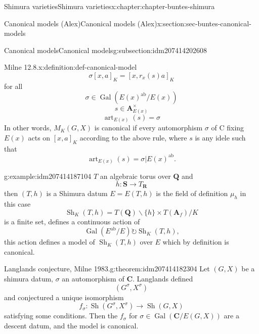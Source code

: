 \documentclass[oneside,10pt,]{book}
\numberwithin{equation}{section}
\newcommand{\lb}{[}
\newcommand{\rb}{]}
\newcommand{\QQ}{\mathbf{Q}}
\newcommand{\RR}{\mathbf{R}}
\newcommand{\CC}{\mathbf{C}}
\newcommand{\adeles}{\mathbf{A}}
\newcommand{\acts}{\circlearrowright}
\newcommand{\ab}{\mathrm{ab}}
\newcommand{\Gal}[2]{\operatorname{Gal}(#1/#2)}
\begin{document}
\begin{chapterptx}{Shimura varieties}{}{Shimura varieties}{}{}{x:chapter:chapter-buntes-shimura}
\begin{sectionptx}{Canonical models (Alex)}{}{Canonical models (Alex)}{}{}{x:section:sec-buntes-canonical-models}
\begin{subsectionptx}{Canonical models}{}{Canonical models}{}{}{g:subsection:idm207414202608}
\begin{definition}{Milne 12.8.}{x:definition:def-canonical-model}
\begin{equation*}
\sigma [x,a]_K = [x, r_x(s) a]_K
\end{equation*}
for all%
\begin{equation*}
\sigma \in \Gal{E(x)^\ab}{E(x)}
\end{equation*}
%
\begin{equation*}
s\in \adeles^\times_{E(x)}
\end{equation*}
%
\begin{equation*}
{\operatorname{art}}_{E(x)}(s) = \sigma
\end{equation*}
In other words, \(M_K(G,X)\) is canonical if every automorphism \(\sigma\) of C fixing \(E(x)\) acts on \(\lb x,a\rb_K\) according to the above rule, where \(s\) is any idele such that%
\begin{equation*}
{\operatorname{art}}_{E(x)}(s) = \sigma| E(x)^{\ab}\text{.}
\end{equation*}
%
\end{definition}
\begin{example}{}{g:example:idm207414187104}%
\(T \) an algebraic torus over \(\QQ\) and%
\begin{equation*}
h \colon \mathbf S \to T_\RR
\end{equation*}
then  \((T,h)\) is a Shimura datum \(E = E(T,h)\) is the field of definition \(\mu_h\) in this case%
\begin{equation*}
{\operatorname{Sh}}_K(T,h) = T(\QQ) \backslash \{h\}  \times T(\adeles_f) / K
\end{equation*}
is a finite set, defines a continuous action of%
\begin{equation*}
\Gal{E^\ab}{E} \acts {\operatorname{Sh}}_K(T,h)\text{,}
\end{equation*}
this action defines a model of \({\operatorname{Sh}}_K(T, h)\) over \(E\) which by definition is canonical.%
\end{example}
\begin{theorem}{Langlands conjecture, Milne 1983.}{}{g:theorem:idm207414182304}%
Let \((G,X)\) be a shimura datum, \(\sigma\) an automorphism of \(\CC\). Langlands defined%
\begin{equation*}
(G^\sigma, X^\sigma)
\end{equation*}
and conjectured a unique isomorphism%
\begin{equation*}
f_\sigma \colon {\operatorname{Sh}}(G^\sigma, X^\sigma) \to {\operatorname{Sh}}(G,X)
\end{equation*}
satisfying some conditions. Then the \(f_\sigma\) for \(\sigma\in \Gal{\CC}{E(G,X)}\) are a descent datum, and the model is canonical.%

\end{theorem}
\end{subsectionptx}
\end{sectionptx}
\end{chapterptx}
\end{document}
